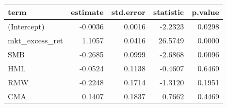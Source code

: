 \begin{table}[ht]
\centering
\begin{tabular}{lrrrr}
  \hline
term & estimate & std.error & statistic & p.value \\ 
  \hline
(Intercept) & -0.0036 & 0.0016 & -2.2323 & 0.0298 \\ 
  mkt\_excess\_ret & 1.1057 & 0.0416 & 26.5749 & 0.0000 \\ 
  SMB & -0.2685 & 0.0999 & -2.6868 & 0.0096 \\ 
  HML & -0.0524 & 0.1138 & -0.4607 & 0.6469 \\ 
  RMW & -0.2248 & 0.1714 & -1.3120 & 0.1951 \\ 
  CMA & 0.1407 & 0.1837 & 0.7662 & 0.4469 \\ 
   \hline
\end{tabular}
\label{tab: summary_neg_2}
\end{table}


